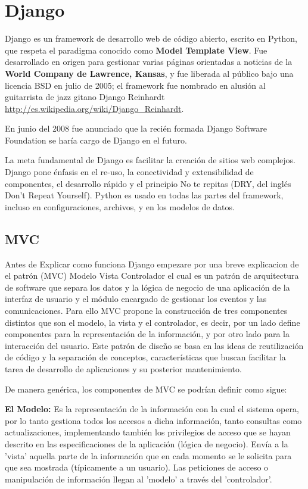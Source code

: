 \section{Django}

Django es un framework de desarrollo web de código abierto, escrito en Python,
que respeta el paradigma conocido como {\bfseries Model Template View}. Fue desarrollado en
origen para gestionar varias páginas orientadas a noticias de la
{\bfseries World Company de Lawrence, Kansas}, y fue liberada al público bajo una licencia
BSD en julio de 2005; el framework fue nombrado en alusión al guitarrista de
jazz gitano Django Reinhardt \url{http://es.wikipedia.org/wiki/Django_Reinhardt}.

En junio del 2008 fue anunciado que la recién formada Django Software Foundation
se haría cargo de Django en el futuro.

La meta fundamental de Django es facilitar la creación de sitios web complejos.
Django pone énfasis en el re-uso, la conectividad y extensibilidad de
componentes, el desarrollo rápido y el principio No te repitas
(DRY, del inglés Don't Repeat Yourself). Python es usado en todas las partes
del framework, incluso en configuraciones, archivos, y en los modelos de datos.


\subsection{MVC}

Antes de Explicar como funciona Django empezare por una breve explicacion de
el patr\'on (MVC) Modelo Vista Controlador el cual es un patrón de arquitectura de software que
separa los datos y la lógica de negocio de una aplicación de la interfaz de
usuario y el módulo encargado de gestionar los eventos y las comunicaciones.
Para ello MVC propone la construcción de tres componentes distintos que son el
modelo, la vista y el controlador, es decir, por un lado define componentes
para la representación de la información, y por otro lado para la interacción
 del usuario. Este patrón de diseño se basa en las ideas de reutilización de
 código y la separación de conceptos, características que buscan facilitar la
 tarea de desarrollo de aplicaciones y su posterior mantenimiento.

De manera genérica, los componentes de MVC se podrían definir como sigue:

{\bfseries  El Modelo:} Es la representación de la información con la cual el sistema opera,
por lo tanto gestiona todos los accesos a dicha información, tanto consultas
como actualizaciones, implementando también los privilegios de acceso que se
hayan descrito en las especificaciones de la aplicación (lógica de negocio).
Envía a la 'vista' aquella parte de la información que en cada momento se le
solicita para que sea mostrada (típicamente a un usuario). Las peticiones de
acceso o manipulación de información llegan al 'modelo' a través del
'controlador'.

